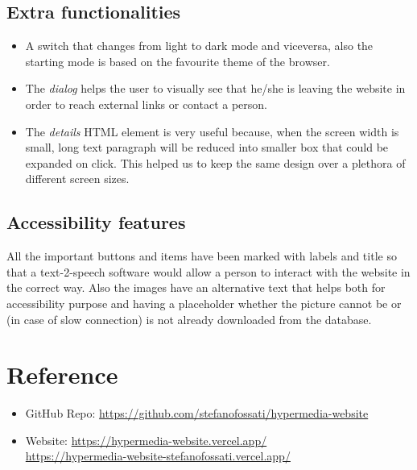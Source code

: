 \documentclass[11pt, letterpaper]{article}
\begin{document}
\subsection{Extra functionalities}
\begin{itemize}
    \item A switch that changes from light to dark mode and viceversa, also the starting mode is based on the favourite theme of the browser.
    \item The \emph{dialog} helps the user to visually see that he/she is leaving the website in order to reach external links or contact a person.
    \item The \emph{details} HTML element is very useful because, when the screen width is small, long text paragraph will be reduced into smaller box that could be expanded on click. This helped us to keep the same design over a plethora of different screen sizes.
\end{itemize}

\subsection{Accessibility features}
All the important buttons and items have been marked with labels and title so that a text-2-speech software would allow a person to interact with the website in the correct way. Also the images have an alternative text that helps both for accessibility purpose and having a placeholder whether the picture cannot be or (in case of slow connection) is not already downloaded from the database. 

\section{Reference}
\begin{itemize}
    \item GitHub Repo: \url{https://github.com/stefanofossati/hypermedia-website}
    \item Website: \url{https://hypermedia-website.vercel.app/} \\ \url{https://hypermedia-website-stefanofossati.vercel.app/}
\end{itemize}

\end{document}
